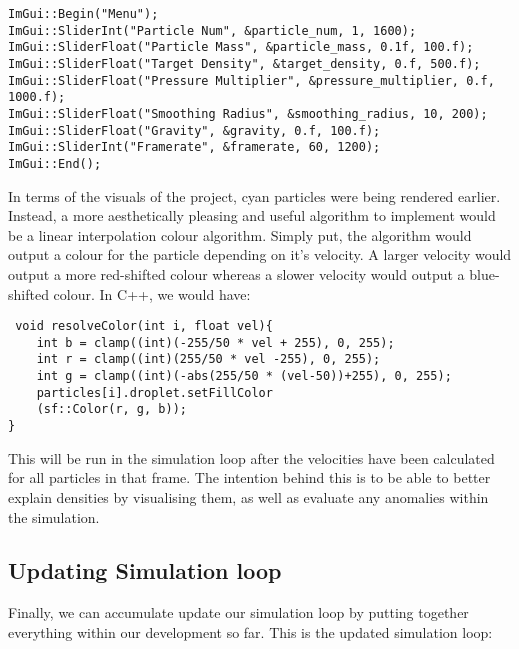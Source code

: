 \documentclass[write-up.tex]{subfiles}
\begin{document}
\begin{lstlisting}
ImGui::Begin("Menu");
ImGui::SliderInt("Particle Num", &particle_num, 1, 1600);
ImGui::SliderFloat("Particle Mass", &particle_mass, 0.1f, 100.f);
ImGui::SliderFloat("Target Density", &target_density, 0.f, 500.f);
ImGui::SliderFloat("Pressure Multiplier", &pressure_multiplier, 0.f, 1000.f);
ImGui::SliderFloat("Smoothing Radius", &smoothing_radius, 10, 200);
ImGui::SliderFloat("Gravity", &gravity, 0.f, 100.f);
ImGui::SliderInt("Framerate", &framerate, 60, 1200);
ImGui::End();
\end{lstlisting}

In terms of the visuals of the project, cyan particles were being rendered earlier. Instead, a more aesthetically pleasing and useful algorithm to implement would be a linear interpolation colour algorithm. Simply put, the algorithm would output a colour for the particle depending on it's velocity. A larger velocity would output a more red-shifted colour whereas a slower velocity would output a blue-shifted colour. In C++, we would have:

\begin{lstlisting}
 void resolveColor(int i, float vel){
    int b = clamp((int)(-255/50 * vel + 255), 0, 255);
    int r = clamp((int)(255/50 * vel -255), 0, 255);
    int g = clamp((int)(-abs(255/50 * (vel-50))+255), 0, 255);
    particles[i].droplet.setFillColor
    (sf::Color(r, g, b));
}
\end{lstlisting}
This will be run in the simulation loop after the velocities have been calculated for all particles in that frame. The intention behind this is to be able to better explain densities by visualising them, as well as evaluate any anomalies within the simulation.
\subsection{Updating Simulation loop}
Finally, we can accumulate update our simulation loop by putting together everything within our development so far. This is the updated simulation loop:
\end{document}
